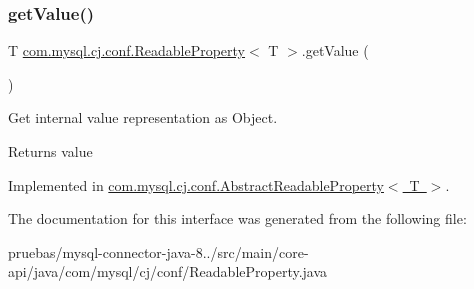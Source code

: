 \mbox{\label{interfacecom_1_1mysql_1_1cj_1_1conf_1_1_readable_property_a602dfa3dbe87560a5ceca17a38f30844}} 
\subsubsection{\texorpdfstring{get\+Value()}{getValue()}}
{\footnotesize\ttfamily T \mbox{\hyperlink{interfacecom_1_1mysql_1_1cj_1_1conf_1_1_readable_property}{com.\+mysql.\+cj.\+conf.\+Readable\+Property}}$<$ T $>$.get\+Value (\begin{DoxyParamCaption}{ }\end{DoxyParamCaption})}

Get internal value representation as Object.

\begin{DoxyReturn}{Returns}
value 
\end{DoxyReturn}


Implemented in \mbox{\hyperlink{classcom_1_1mysql_1_1cj_1_1conf_1_1_abstract_readable_property_abb381de77253efc91da51b518f28ed42}{com.\+mysql.\+cj.\+conf.\+Abstract\+Readable\+Property$<$ T $>$}}.



The documentation for this interface was generated from the following file\+:\begin{DoxyCompactItemize}
\item 
pruebas/mysql-\/connector-\/java-\/8../src/main/core-\/api/java/com/mysql/cj/conf/Readable\+Property.\+java\end{DoxyCompactItemize}

